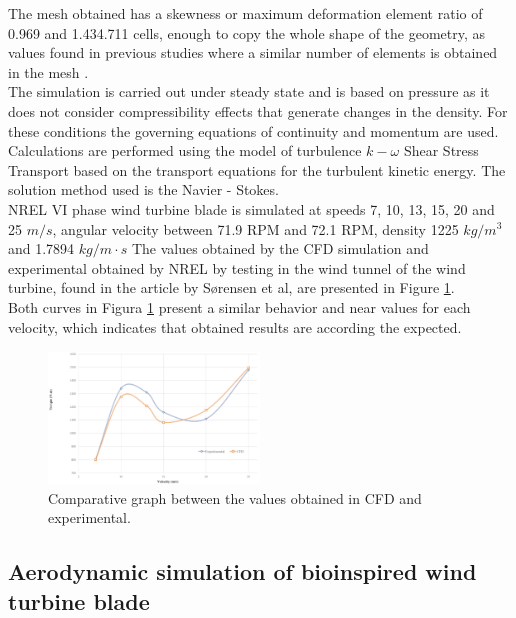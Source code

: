 The mesh obtained has a skewness or maximum deformation element  ratio of  0.969 and 1.434.711 cells, enough to copy the whole shape of the geometry, as values found in previous studies where a similar number of elements is obtained in the mesh \cite{nata}.\\

The simulation is carried out under steady state and is based on pressure as it does not consider compressibility effects that generate changes in the density. For these conditions the governing equations of continuity and momentum are used. Calculations are performed using the model of turbulence $k-\omega$ Shear Stress Transport based on the transport equations for the turbulent kinetic energy. The solution method used is the Navier - Stokes.\\

NREL VI phase wind turbine blade is simulated at speeds 7, 10, 13, 15, 20 and 25 $m/s$, angular velocity between 71.9 RPM and 72.1 RPM, density 1225 $kg/m^3$ and 1.7894 $kg/m\cdot s$ The values obtained by the CFD simulation and experimental obtained by NREL by testing in the wind tunnel of the wind turbine, found in the article by Sørensen et al, are presented in Figure \ref{fig:2}.\\ 

Both curves in Figura \ref{fig:2} present a similar behavior and near values for each velocity, which indicates that obtained results are according the expected.  

\begin{figure}[H]
  \includegraphics[width=0.5\textwidth]{vali}%
\caption{Comparative graph between the values obtained in CFD and experimental.}
\label{fig:2}       %
\end{figure}

\subsection{Aerodynamic simulation of bioinspired wind turbine blade}

